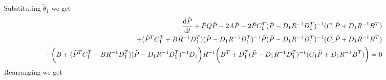 Substituting $\tilde{\theta}_1$ we get 
\begin{align*}
     \frac{\mathrm{d} \tilde{P}}{\mathrm{d} t} + \tilde{P}Q \tilde{P} -2 A \tilde{P}  - 2 \tilde{P}C^T_1(\tilde{P} - D_1 R^{-1} D_1^T)^{-1} (C_1 \tilde{P} + D_1 R^{-1}B^T)\\
     + ( \tilde{P}^T C^T_1 + B  R^{-1}D_1^T) (\tilde{P} - D_1 R^{-1} D_1^T)^{-1}  \tilde{P} (\tilde{P} - D_1 R^{-1} D_1^T)^{-1} (C_1 \tilde{P} + D_1 R^{-1}B^T)\\
    - \bigg(B +( \tilde{P}^T C^T_1 + B  R^{-1}D_1^T) (\tilde{P} - D_1 R^{-1} D_1^T)^{-1} D_1\bigg) {R}^{-1 } \bigg(B^T + D_1^T (\tilde{P} - D_1 R^{-1} D_1^T)^{-1} (C_1 \tilde{P} + D_1 R^{-1}B^T)\bigg) = 0
\end{align*}
Rearranging we get


